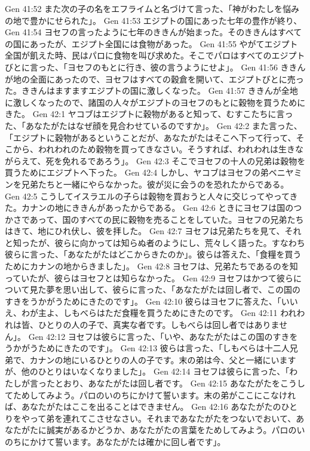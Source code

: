 Gen 41:52  また次の子の名をエフライムと名づけて言った、「神がわたしを悩みの地で豊かにせられた」。
Gen 41:53  エジプトの国にあった七年の豊作が終り、
Gen 41:54  ヨセフの言ったように七年のききんが始まった。そのききんはすべての国にあったが、エジプト全国には食物があった。
Gen 41:55  やがてエジプト全国が飢えた時、民はパロに食物を叫び求めた。そこでパロはすべてのエジプトびとに言った、「ヨセフのもとに行き、彼の言うようにせよ」。
Gen 41:56  ききんが地の全面にあったので、ヨセフはすべての穀倉を開いて、エジプトびとに売った。ききんはますますエジプトの国に激しくなった。
Gen 41:57  ききんが全地に激しくなったので、諸国の人々がエジプトのヨセフのもとに穀物を買うためにきた。
Gen 42:1  ヤコブはエジプトに穀物があると知って、むすこたちに言った、「あなたがたはなぜ顔を見合わせているのですか」。
Gen 42:2  また言った、「エジプトに穀物があるということだが、あなたがたはそこへ下って行って、そこから、われわれのため穀物を買ってきなさい。そうすれば、われわれは生きながらえて、死を免れるであろう」。
Gen 42:3  そこでヨセフの十人の兄弟は穀物を買うためにエジプトへ下った。
Gen 42:4  しかし、ヤコブはヨセフの弟ベニヤミンを兄弟たちと一緒にやらなかった。彼が災に会うのを恐れたからである。
Gen 42:5  こうしてイスラエルの子らは穀物を買おうと人々に交じってやってきた。カナンの地にききんがあったからである。
Gen 42:6  ときにヨセフは国のつかさであって、国のすべての民に穀物を売ることをしていた。ヨセフの兄弟たちはきて、地にひれ伏し、彼を拝した。
Gen 42:7  ヨセフは兄弟たちを見て、それと知ったが、彼らに向かっては知らぬ者のようにし、荒々しく語った。すなわち彼らに言った、「あなたがたはどこからきたのか」。彼らは答えた、「食糧を買うためにカナンの地からきました」。
Gen 42:8  ヨセフは、兄弟たちであるのを知っていたが、彼らはヨセフとは知らなかった。
Gen 42:9  ヨセフはかつて彼らについて見た夢を思い出して、彼らに言った、「あなたがたは回し者で、この国のすきをうかがうためにきたのです」。
Gen 42:10  彼らはヨセフに答えた、「いいえ、わが主よ、しもべらはただ食糧を買うためにきたのです。
Gen 42:11  われわれは皆、ひとりの人の子で、真実な者です。しもべらは回し者ではありません」。
Gen 42:12  ヨセフは彼らに言った、「いや、あなたがたはこの国のすきをうかがうためにきたのです」。
Gen 42:13  彼らは言った、「しもべらは十二人兄弟で、カナンの地にいるひとりの人の子です。末の弟は今、父と一緒にいますが、他のひとりはいなくなりました」。
Gen 42:14  ヨセフは彼らに言った、「わたしが言ったとおり、あなたがたは回し者です。
Gen 42:15  あなたがたをこうしてためしてみよう。パロのいのちにかけて誓います。末の弟がここにこなければ、あなたがたはここを出ることはできません。
Gen 42:16  あなたがたのひとりをやって弟を連れてこさせなさい。それまであなたがたをつないでおいて、あなたがたに誠実があるかどうか、あなたがたの言葉をためしてみよう。パロのいのちにかけて誓います。あなたがたは確かに回し者です」。
